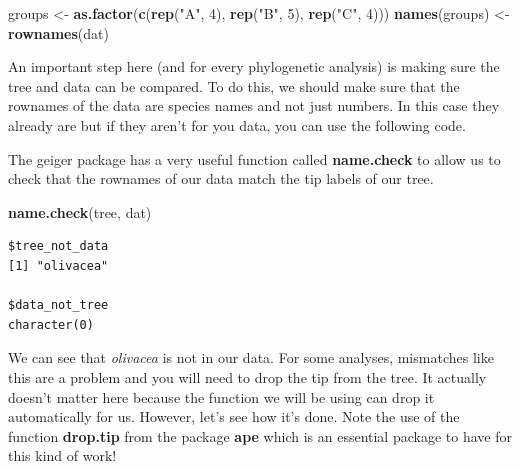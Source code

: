 \documentclass[
]{book}
\newenvironment{Shaded}{\begin{snugshade}}{\end{snugshade}}
\newcommand{\CommentTok}[1]{\textcolor[rgb]{0.56,0.35,0.01}{\textit{#1}}}
\newcommand{\DecValTok}[1]{\textcolor[rgb]{0.00,0.00,0.81}{#1}}
\newcommand{\KeywordTok}[1]{\textcolor[rgb]{0.13,0.29,0.53}{\textbf{#1}}}
\newcommand{\NormalTok}[1]{#1}
\newcommand{\OperatorTok}[1]{\textcolor[rgb]{0.81,0.36,0.00}{\textbf{#1}}}
\newcommand{\StringTok}[1]{\textcolor[rgb]{0.31,0.60,0.02}{#1}}
\begin{document}
\begin{Shaded}
\begin{Highlighting}[]
\NormalTok{groups \textless{}{-}}\StringTok{ }\KeywordTok{as.factor}\NormalTok{(}\KeywordTok{c}\NormalTok{(}\KeywordTok{rep}\NormalTok{(}\StringTok{"A"}\NormalTok{, }\DecValTok{4}\NormalTok{), }\KeywordTok{rep}\NormalTok{(}\StringTok{"B"}\NormalTok{, }\DecValTok{5}\NormalTok{), }\KeywordTok{rep}\NormalTok{(}\StringTok{"C"}\NormalTok{, }\DecValTok{4}\NormalTok{)))}
\KeywordTok{names}\NormalTok{(groups) \textless{}{-}}\StringTok{ }\KeywordTok{rownames}\NormalTok{(dat)}
\end{Highlighting}
\end{Shaded}

An important step here (and for every phylogenetic analysis) is making sure the tree and data can be compared. To do this, we should make sure that the rownames of the data are species names and not just numbers. In this case they already are but if they aren't for you data, you can use the following code.

\begin{Shaded}
\end{Shaded}

The geiger package has a very useful function called \textbf{name.check} to allow us to check that the rownames of our data match the tip labels of our tree.

\begin{Shaded}
\begin{Highlighting}[]
\KeywordTok{name.check}\NormalTok{(tree, dat)}
\end{Highlighting}
\end{Shaded}

\begin{verbatim}
$tree_not_data
[1] "olivacea"

$data_not_tree
character(0)
\end{verbatim}

We can see that \emph{olivacea} is not in our data. For some analyses, mismatches like this are a problem and you will need to drop the tip from the tree. It actually doesn't matter here because the function we will be using can drop it automatically for us. However, let's see how it's done. Note the use of the function \textbf{drop.tip} from the package \textbf{ape} \citep{ape} which is an essential package to have for this kind of work!
\end{document}
